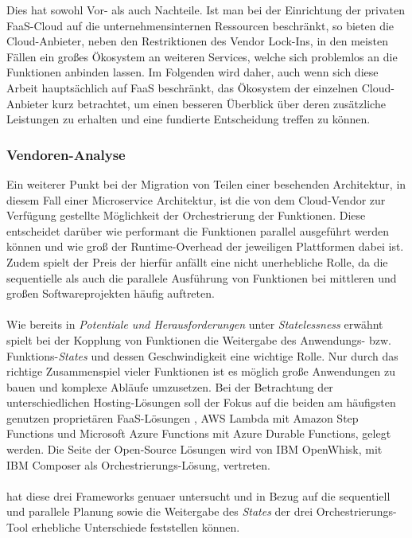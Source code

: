 \documentclass[11pt]{article}
\begin{document}
Dies hat sowohl Vor- als auch Nachteile. Ist man bei der Einrichtung der privaten FaaS-Cloud auf die unternehmensinternen Ressourcen beschränkt, so bieten die Cloud-Anbieter, neben den Restriktionen des Vendor Lock-Ins, in den meisten Fällen ein großes Ökosystem an weiteren Services, welche sich problemlos an die Funktionen anbinden lassen. Im Folgenden wird daher, auch wenn sich diese Arbeit hauptsächlich auf FaaS beschränkt, das Ökosystem der einzelnen Cloud-Anbieter kurz betrachtet, um einen besseren Überblick über deren zusätzliche Leistungen zu erhalten und eine fundierte Entscheidung treffen zu können.
\subsubsection{Vendoren-Analyse}
Ein weiterer Punkt bei der Migration von Teilen einer besehenden Architektur, in diesem Fall einer Microservice Architektur, ist die von dem Cloud-Vendor zur Verfügung gestellte Möglichkeit der Orchestrierung der Funktionen. Diese entscheidet darüber wie performant die Funktionen parallel ausgeführt werden können und wie groß der Runtime-Overhead der jeweiligen Plattformen dabei ist. Zudem spielt der Preis der hierfür anfällt eine nicht unerhebliche Rolle, da die sequentielle als auch die parallele Ausführung von Funktionen bei mittleren und großen Softwareprojekten häufig auftreten. \\\\
Wie bereits in \textit{Potentiale und Herausforderungen} unter \textit{Statelessness} erwähnt spielt bei der Kopplung von Funktionen die Weitergabe des Anwendungs- bzw. Funktions-\textit{States} und dessen Geschwindigkeit eine wichtige Rolle. Nur durch das richtige Zusammenspiel vieler Funktionen ist es möglich große Anwendungen zu bauen und komplexe Abläufe umzusetzen. Bei der Betrachtung der unterschiedlichen Hosting-Lösungen soll der Fokus auf die beiden am häufigsten genutzen proprietären FaaS-Lösungen \cite{leitner2019mixed}, AWS Lambda mit Amazon Step Functions und Microsoft Azure Functions mit Azure Durable Functions, gelegt werden. Die Seite der Open-Source Lösungen wird von IBM OpenWhisk, mit IBM Composer als Orchestrierungs-Lösung, vertreten.\\\\
\cite{lopez2018comparison} hat diese drei Frameworks genuaer untersucht und in Bezug auf die sequentiell und parallele Planung sowie die Weitergabe des \textit{States} der drei Orchestrierungs-Tool erhebliche Unterschiede feststellen können.  
\end{document}
